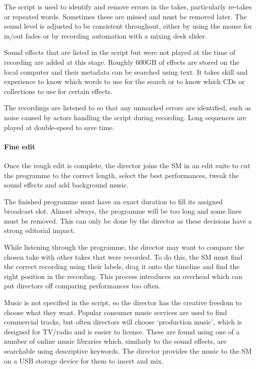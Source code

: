 The script is used to identify and remove errors in the takes, particularly re-takes or repeated words. Sometimes these
are missed and must be removed later. The sound level is adjusted to be consistent throughout, either by using the
mouse for in/out fades or by recording automation with a mixing desk slider.

Sound effects that are listed in the script but were not played at the time of recording are added at this stage.
Roughly 600GB of effects are stored on the local computer and their metadata can be searched using text. It takes skill
and experience to know which words to use for the search or to know which CDs or collections to use for certain
effects.

The recordings are listened to so that any unmarked errors are identified, such as noise caused by actors handling the
script during recording. Long sequences are played at double-speed to save time.

\paragraph{Fine edit}\label{sec:drama-fine}
Once the rough edit is complete, the director joins the SM in an edit suite to cut the programme to the correct length,
select the best performances, tweak the sound effects and add background music.

The finished programme must have an exact duration to fill its assigned broadcast slot. Almost always, the programme
will be too long and some lines must be removed. This can only be done by the director as these decisions have a strong
editorial impact.

While listening through the programme, the director may want to compare the chosen take with other takes that were
recorded. To do this, the SM must find the correct recording using their labels, drag it onto the timeline and find the
right position in the recording. This process introduces an overhead which can put directors off comparing performances
too often.

Music is not specified in the script, so the director has the creative freedom to choose what they want. Popular
consumer music services are used to find commercial tracks, but often directors will choose `production music', which
is designed for TV/radio and is easier to license. These are found using one of a number of online music libraries
which, similarly to the sound effects, are searchable using descriptive keywords. The director provides the music to
the SM on a USB storage device for them to insert and mix.

